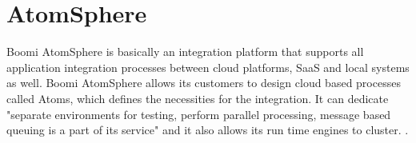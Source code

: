 \section{AtomSphere}

Boomi AtomSphere is basically an integration platform that supports all 
application integration processes between cloud platforms, SaaS and local 
systems as well. Boomi AtomSphere allows its customers to design cloud based 
processes called Atoms, which defines the necessities for the integration.
It can dedicate "separate environments for testing, perform 
parallel processing, message based queuing is a part of its service" and it 
also allows its run time engines to cluster. 
\cite{hid-sp18-418-AtomSphere-features}. 
